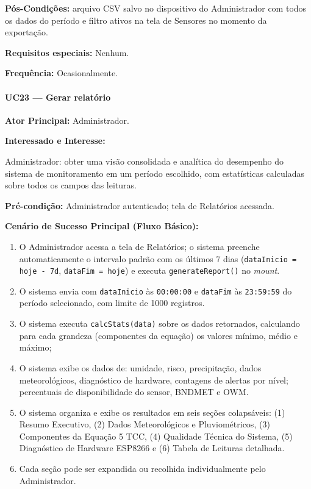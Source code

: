 \textbf{Pós-Condições:} arquivo CSV salvo no dispositivo
do Administrador com todos os dados do período e filtro
ativos na tela de Sensores no momento da exportação.

\textbf{Requisitos especiais:} Nenhum.

\textbf{Frequência:} Ocasionalmente.

\paragraph{UC23 --- Gerar relatório}\hfill\break

\textbf{Ator Principal:} Administrador.

\textbf{Interessado e Interesse:}

Administrador: obter uma visão consolidada e analítica
do desempenho do sistema de monitoramento em um
período escolhido, com estatísticas calculadas sobre
todos os campos das leituras.

\textbf{Pré-condição:} Administrador autenticado; tela
de Relatórios acessada.

\textbf{Cenário de Sucesso Principal (Fluxo Básico):}
\begin{enumerate}
  \item O Administrador acessa a tela de Relatórios; o
        sistema preenche automaticamente o intervalo
        padrão com os últimos 7 dias
        (\texttt{dataInicio = hoje - 7d},
        \texttt{dataFim = hoje}) e executa
        \texttt{generateReport()} no \textit{mount}.
  \item O sistema envia
        com \texttt{dataInicio} às \texttt{00:00:00} e
        \texttt{dataFim} às \texttt{23:59:59} do período
        selecionado, com limite de 1000 registros.
  \item O sistema executa \texttt{calcStats(data)} sobre
        os dados retornados, calculando para cada grandeza
        (componentes da equação) os valores mínimo, médio e máximo; 
  \item O sistema exibe os dados de: umidade, risco, precipitação, 
        dados meteorológicos, diagnóstico de hardware,
        contagens de alertas por nível; percentuais de
        disponibilidade do sensor, BNDMET e OWM.
  \item O sistema organiza e exibe os resultados em seis
        seções colapsáveis: (1) Resumo Executivo, (2)
        Dados Meteorológicos e Pluviométricos, (3)
        Componentes da Equação 5 TCC, (4) Qualidade
        Técnica do Sistema, (5) Diagnóstico de Hardware
        ESP8266 e (6) Tabela de Leituras detalhada.
  \item Cada seção pode ser expandida ou recolhida
        individualmente pelo Administrador.
\end{enumerate}

